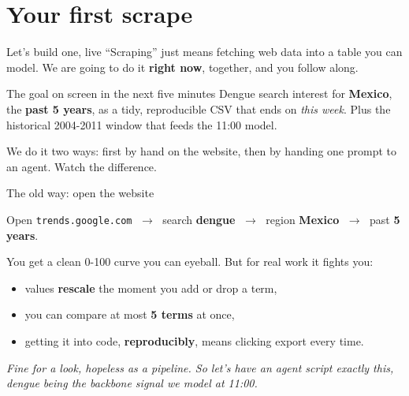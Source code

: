 \documentclass[aspectratio=169,11pt]{beamer}
\begin{document}
\section{Your first scrape}

\begin{frame}{Let's build one, live}
  ``Scraping'' just means fetching web data into a table you can model. We are going to
  do it \textbf{right now}, together, and you follow along.
  \vspace{0.3em}
  \begin{block}{The goal on screen in the next five minutes}
    Dengue search interest for \textbf{Mexico}, the \textbf{past 5 years}, as a tidy,
    reproducible CSV that ends on \emph{this week}. Plus the historical 2004-2011 window
    that feeds the 11:00 model.
  \end{block}
  \vspace{0.3em}
  We do it two ways: first by hand on the website, then by handing one prompt to an
  agent. Watch the difference.
\end{frame}

\begin{frame}{The old way: open the website}
  \begin{exampleblock}{Open}
    \texttt{trends.google.com} $\;\rightarrow\;$ search \textbf{dengue}
    $\;\rightarrow\;$ region \textbf{Mexico} $\;\rightarrow\;$ past \textbf{5 years}.
  \end{exampleblock}
  \medskip
  You get a clean 0-100 curve you can eyeball. But for real work it fights you:
  \begin{itemize}
    \item values \textbf{rescale} the moment you add or drop a term,
    \item you can compare at most \textbf{5 terms} at once,
    \item getting it into code, \textbf{reproducibly}, means clicking export every time.
  \end{itemize}
  \vspace{0.2em}
  \begin{center}
    \itshape Fine for a look, hopeless as a pipeline. So let's have an agent script
    exactly this, dengue being the backbone signal we model at 11:00.
  \end{center}
\end{frame}
\end{document}

